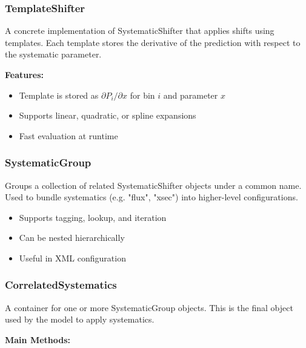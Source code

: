 \vspace{1em}
\subsubsection*{\color{cadmiumgreen}\bf TemplateShifter}

A concrete implementation of {\color{cadmiumgreen} SystematicShifter} that applies shifts using templates.  
Each template stores the derivative of the prediction with respect to the systematic parameter.

\vspace{0.5em}
\noindent\textbf{Features:}

\begin{itemize}
  \item Template is stored as $\partial P_i / \partial x$ for bin $i$ and parameter $x$
  \item Supports linear, quadratic, or spline expansions
  \item Fast evaluation at runtime
\end{itemize}

\vspace{1em}
\subsubsection*{\color{cadmiumgreen}\bf SystematicGroup}

Groups a collection of related {\color{cadmiumgreen} SystematicShifter} objects under a common name.  
Used to bundle systematics (e.g. "flux", "xsec") into higher-level configurations.

\begin{itemize}
  \item Supports tagging, lookup, and iteration
  \item Can be nested hierarchically
  \item Useful in XML configuration
\end{itemize}

\vspace{1em}
\subsubsection*{\color{cadmiumgreen}\bf CorrelatedSystematics}

A container for one or more {\color{cadmiumgreen} SystematicGroup} objects.  
This is the final object used by the model to apply systematics.

\vspace{0.5em}
\noindent\textbf{Main Methods:}

